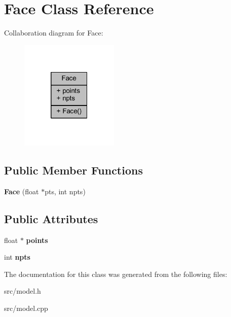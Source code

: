 \hypertarget{class_face}{}\section{Face Class Reference}
\label{class_face}


Collaboration diagram for Face\+:
\nopagebreak
\begin{figure}[H]
\begin{center}
\leavevmode
\includegraphics[width=133pt]{class_face__coll__graph}
\end{center}
\end{figure}
\subsection*{Public Member Functions}
\begin{DoxyCompactItemize}
\item 
\mbox{\label{class_face_a890f52c15855e434e6c0f853bcf7f40d}} 
{\bfseries Face} (float $\ast$pts, int npts)
\end{DoxyCompactItemize}
\subsection*{Public Attributes}
\begin{DoxyCompactItemize}
\item 
\mbox{\label{class_face_a402240ad45f918a772d83f3022f9589f}} 
float $\ast$ {\bfseries points}
\item 
\mbox{\label{class_face_ac35360914de7ce1903058a598b9fe7ab}} 
int {\bfseries npts}
\end{DoxyCompactItemize}


The documentation for this class was generated from the following files\+:\begin{DoxyCompactItemize}
\item 
src/model.\+h\item 
src/model.\+cpp\end{DoxyCompactItemize}
